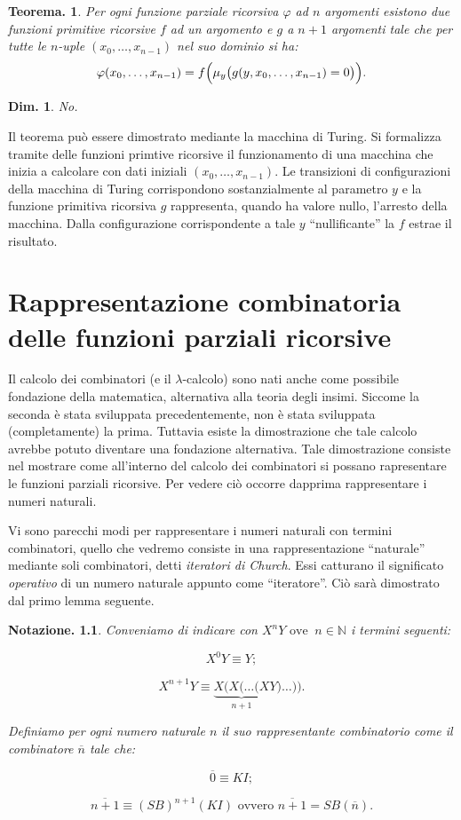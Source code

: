 \documentclass{book}
\newtheorem{teorema}{Teorema.}[chapter]
\newtheorem{dimostrazione}{Dim.}[chapter]
\newtheorem{notazione}{Notazione.}
\begin{document}
\begin{teorema}
Per ogni funzione parziale ricorsiva $\varphi$ ad $n$ argomenti esistono due
funzioni primitive ricorsive $f$ ad un argomento e $g$ a $n + 1$ argomenti
tale che per tutte le $n$-uple $(x_0, \ldots , x_{n-1})$ nel suo dominio si ha:
\[
\varphi(x_0, \ldots , x_{n-1}) = f\Bigl(\mu_y\bigl(g(y, x_0, \ldots , x_{n-1}
) = 0 \bigr) \Bigr).
\]
\end{teorema}

\begin{dimostrazione}
No.
\end{dimostrazione}
Il teorema pu\`o essere dimostrato mediante la macchina di Turing. Si 
formalizza tramite delle funzioni primtive ricorsive il funzionamento di una 
macchina che inizia a calcolare con dati iniziali $(x_0, \ldots , x_{n-1})$.
Le transizioni di configurazioni della macchina di Turing corrispondono 
sostanzialmente al parametro $y$ e la funzione primitiva ricorsiva $g$ 
rappresenta, quando ha valore nullo, l'arresto della macchina.
Dalla configurazione corrispondente a tale $y$ ``nullificante'' la $f$ 
estrae il risultato.

\chapter[Rapp.ne funz. parz. ric.]{Rappresentazione combinatoria delle 
funzioni parziali ricorsive}
Il calcolo dei combinatori (e il $\lambda$-calcolo) sono nati anche come 
possibile fondazione della matematica, alternativa alla teoria degli insimi.
Siccome la seconda \`e stata sviluppata precedentemente, non \`e stata 
sviluppata (completamente) la prima. Tuttavia esiste la dimostrazione che tale 
calcolo avrebbe potuto diventare una fondazione alternativa. Tale dimostrazione
 consiste nel mostrare come all'interno del calcolo dei combinatori si possano 
rapresentare le funzioni parziali ricorsive. Per vedere ci\`o occorre dapprima 
rappresentare i numeri naturali.

Vi sono parecchi modi per rappresentare i numeri naturali con termini combinatori, quello che vedremo consiste in una rappresentazione ``naturale'' mediante 
soli combinatori, detti \emph{iteratori di Church}. Essi catturano il significato \emph{operativo} di un numero naturale appunto come ``iteratore''. Ci\`o 
sar\`a dimostrato dal primo lemma seguente.

\begin{notazione}
Conveniamo di indicare con $X^{n}Y \text{ ove } \ n \in \mathbb{N}$ i termini 
seguenti:

\[
X^0Y \equiv Y;
\]

\[
X^{n+1}Y \equiv \underbrace{X(X(\ldots (X}_{n+1}Y)\ldots )).
\]

Definiamo per ogni numero naturale $n$ il suo \emph{rappresentante combinatorio
} come il combinatore $\overline{n}$ tale che:

\[
\overline{0} \equiv KI;
\]

\[
\overline{n+1} \equiv (SB)^{n+1}(KI) \text{ ovvero } \overline{n+1} = SB(
\overline{n}).
\]

\end{notazione}
\end{document}
